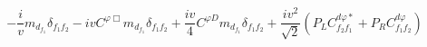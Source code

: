 %
\begin{dmath*}
%
  -  \frac{i}{v}  m_{d_{f_1}} \delta_{f_1 f_2}  -  i v  C^{ \varphi  \Box} m_{d_{f_1}} \delta_{f_1 f_2}  +  \frac{i v}{4}  C^{ \varphi  D} m_{d_{f_1}} \delta_{f_1 f_2}  +  \frac{i v^2}{\sqrt{2}} \left(P_L C^{d \varphi  *}_{f_2 f_1} + P_R C^{d \varphi  }_{f_1 f_2}\right)
%
\end{dmath*}
%
